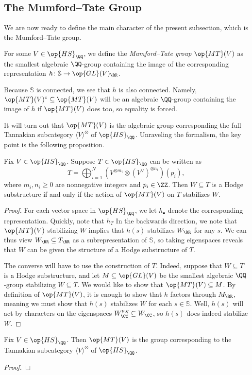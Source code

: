 \documentclass{article}
\begin{document}

\subsection{The Mumford--Tate Group}
We are now ready to define the main character of the present subsection, which is the Mumford--Tate group.\todo{}
\begin{definition}
	For some $V\in\op{HS}_\QQ$, we define the \textit{Mumford--Tate group} $\op{MT}(V)$ as the smallest algebraic $\QQ$-group containing the image of the corresponding representation $h\colon\mathbb S\to\op{GL}(V)_\RR$.
\end{definition}
\begin{remark}
	Because $\mathbb S$ is connected, we see that $h$ is also connected. Namely, $\op{MT}(V)^\circ\subseteq\op{MT}(V)$ will be an algebraic $\QQ$-group containing the image of $h$ if $\op{MT}(V)$ does too, so equality is forced.
\end{remark}
It will turn out that $\op{MT}(V)$ is the algebraic group corresponding the full Tannakian subcategory $\langle V\rangle^{\otimes}$ of $\op{HS}_\QQ$. Unraveling the formalism, the key point is the following proposition.
\begin{proposition}
	Fix $V\in\op{HS}_\QQ$. Suppose $T\in\op{HS}_\QQ$ can be written as
	\[T=\bigoplus_{i=1}^N\left(V^{\otimes m_i}\otimes (V^\lor)^{\otimes n_i}\right)(p_i),\]
	where $m_i,n_i\ge0$ are nonnegative integers and $p_i\in\ZZ$. Then $W\subseteq T$ is a Hodge substructure if and only if the action of $\op{MT}(V)$ on $T$ stabilizes $W$.
\end{proposition}
\begin{proof}
	For each vector space in $\op{HS}_\QQ$, we let $h_\bullet$ denote the corresponding representation. Quickly, note that $h_T$ In the backwards direction, we note that $\op{MT}(V)$ stabilizing $W$ implies that $h(s)$ stabilizes $W_\RR$ for any $s$. We can thus view $W_\RR\subseteq T_\RR$ as a subrepresentation of $\mathbb S$, so taking eigenspaces reveals that $W$ can be given the structure of a Hodge substructure of $T$.

	The converse will have to use the construction of $T$. Indeed, suppose that $W\subseteq T$ is a Hodge substructure, and let $M\subseteq\op{GL}(V)$ be the smallest algebraic $\QQ$-group stabilizing $W\subseteq T$. We would like to show that $\op{MT}(V)\subseteq M$. By definition of $\op{MT}(V)$, it is enough to show that $h$ factors through $M_\RR$, meaning we must show that $h(s)$ stabilizes $W$ for each $s\in\mathbb S$. Well, $h(s)$ will act by characters on the eigenspaces $W^{p,q}_\CC\subseteq W_\CC$, so $h(s)$ does indeed stabilize $W$.
\end{proof}
\begin{corollary}
	Fix $V\in\op{HS}_\QQ$. Then $\op{MT}(V)$ is the group corresponding to the Tannakian subcategory $\langle V\rangle^{\otimes}$ of $\op{HS}_\QQ$.
\end{corollary}
\begin{proof}
	
\end{proof}
\end{document}
